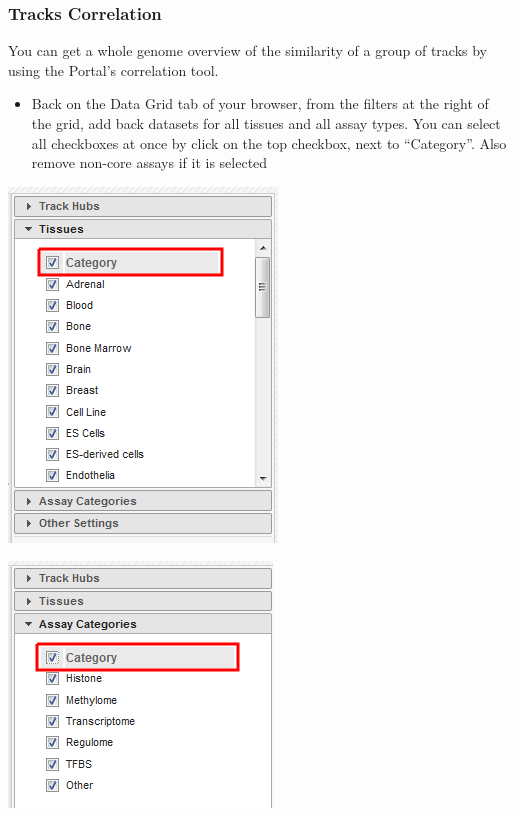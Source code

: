\documentclass[
]{book}
\providecommand{\tightlist}{%
  \setlength{\itemsep}{0pt}\setlength{\parskip}{0pt}}
\begin{document}
\subsubsection{Tracks Correlation}\label{tracks-correlation}

You can get a whole genome overview of the similarity of a group of tracks by using the Portal's correlation tool.

\begin{itemize}
\tightlist
\item
  Back on the Data Grid tab of your browser, from the filters at the right of the grid, add back datasets for all tissues and all assay types. You can select all checkboxes at once by click on the top checkbox, next to ``Category''. Also remove non-core assays if it is selected
\end{itemize}

\includegraphics{./img/portal_selectAllTissues.png}

\includegraphics{./img/portal_selectAllAssays.png}
\end{document}
